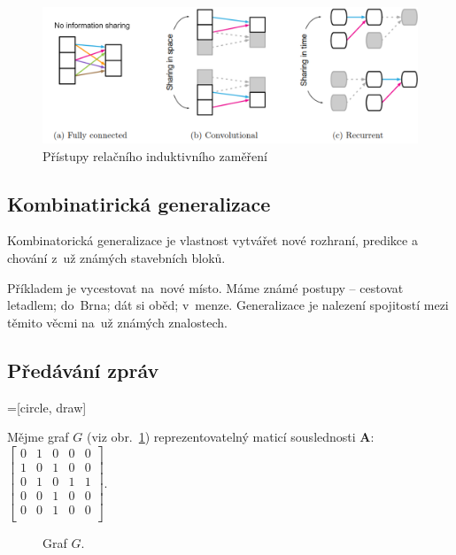 \begin{figure}[ht]
    \centering
	\includegraphics[width=\textwidth]{images/11_RIB}
    \caption{Přístupy relačního induktivního zaměření}
\end{figure}

\subsection{Kombinatirická generalizace}

Kombinatorická generalizace je vlastnost vytvářet nové rozhraní, predikce a chování z~už známých stavebních bloků.

Příkladem je vycestovat na~nové místo.
Máme známé postupy -- cestovat letadlem; do~Brna; dát si oběd; v~menze.
Generalizace je nalezení spojitostí mezi těmito věcmi na~už známých znalostech.

\subsection{Předávání zpráv}
=[circle, draw]

Mějme graf $G$ (viz obr.~\ref{graf-pro-predavani-zprav}) reprezentovatelný maticí souslednosti $\mathbf{A}$: 
$\left[ \begin{matrix}
0 & 1 & 0 & 0 & 0 \\
1 & 0 & 1 & 0 & 0 \\
0 & 1 & 0 & 1 & 1 \\
0 & 0 & 1 & 0 & 0 \\
0 & 0 & 1 & 0 & 0 \\
\end{matrix} \right]$.

\begin{figure}[ht]
    \centering
    \caption{Graf $G$.}
    \label{graf-pro-predavani-zprav}
\end{figure}
\FloatBarrier

